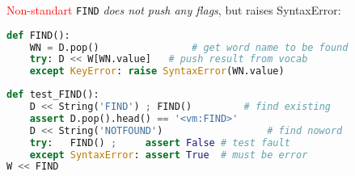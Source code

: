 \noindent\label{FIND}
\textcolor{red}{Non-standart} \verb|FIND| \emph{does not push any flags}, but
raises SyntaxError:
\begin{lstlisting}[language=Python]
def FIND():
	WN = D.pop()				# get word name to be found
	try: D << W[WN.value]	# push result from vocab
	except KeyError: raise SyntaxError(WN.value)
\end{lstlisting}

\begin{lstlisting}[language=Python]
def test_FIND():
	D << String('FIND') ; FIND()		 # find existing
	assert D.pop().head() == '<vm:FIND>'
	D << String('NOTFOUND')				 	 # find noword
	try:   FIND() ;     assert False # test fault
	except SyntaxError: assert True  # must be error
W << FIND
\end{lstlisting}
